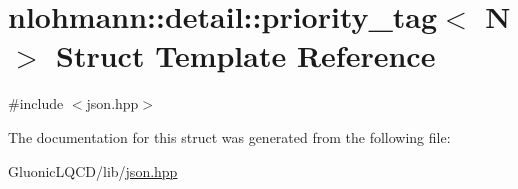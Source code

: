 \hypertarget{structnlohmann_1_1detail_1_1priority__tag}{}\section{nlohmann\+::detail\+::priority\+\_\+tag$<$ N $>$ Struct Template Reference}
\label{structnlohmann_1_1detail_1_1priority__tag}


{\ttfamily \#include $<$json.\+hpp$>$}



The documentation for this struct was generated from the following file\+:\begin{DoxyCompactItemize}
\item 
Gluonic\+L\+Q\+C\+D/lib/\mbox{\hyperlink{json_8hpp}{json.\+hpp}}\end{DoxyCompactItemize}
